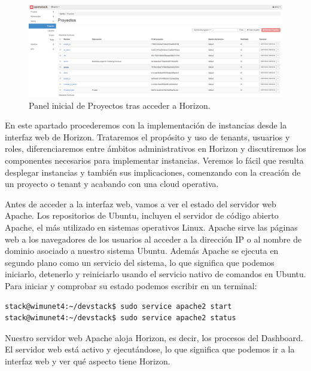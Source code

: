 
\begin{figure}
    \centering
    \includegraphics[width=1\textwidth]{imagenes/capitulo6/primeracceso.png}
    \caption{Panel inicial de Proyectos tras acceder a Horizon.}
	\vspace{0.3cm}
    \label{primeracceso}
\end{figure}

En este apartado procederemos con la implementación de instancias desde la interfaz web de Horizon. Trataremos el propósito y uso de tenants, usuarios y roles, diferenciaremos entre ámbitos administrativos en Horizon y discutiremos los componentes necesarios para implementar instancias. Veremos lo fácil que resulta desplegar instancias y también sus implicaciones, comenzando con la creación de un proyecto o tenant y acabando con una cloud operativa.

Antes de acceder a la interfaz web, vamos a ver el estado del servidor web Apache. Los repositorios de Ubuntu, incluyen el servidor de código abierto Apache, el más utilizado en sistemas operativos Linux. Apache sirve las páginas web a los navegadores de los usuarios al acceder a la dirección IP o al nombre de dominio asociado a nuestro sistema Ubuntu. Además Apache se ejecuta en segundo plano como un servicio del sistema, lo que significa que podemos iniciarlo, detenerlo y reiniciarlo usando el servicio nativo de comandos en Ubuntu. Para iniciar y comprobar su estado podemos escribir en un terminal:

\begin{lstlisting}
stack@wimunet4:~/devstack$ sudo service apache2 start
stack@wimunet4:~/devstack$ sudo service apache2 status
\end{lstlisting}

Nuestro servidor web Apache aloja Horizon, es decir, los procesos del Dashboard. El servidor web está activo y ejecutándose, lo que significa que podemos ir a la interfaz web y ver qué aspecto tiene Horizon.

